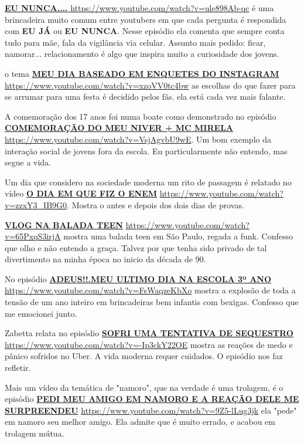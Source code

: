 \href{https://www.youtube.com/watch?v=ule898Ab-qc}{\textbf{EU NUNCA.... }} \url{https://www.youtube.com/watch?v=ule898Ab-qc} é uma brincadeira muito comum entre youtubers em que cada pergunta é respondida com \textbf{EU JÁ} ou \textbf{EU NUNCA}. Nesse episódio ela comenta que sempre conta tudo para mãe, fala da vigilância via celular. Assunto mais pedido: ficar, namorar... relacionamento é algo que inspira muito a curiosidade dos jovens.

o tema \href{https://www.youtube.com/watch?v=xzoVV0tc4bw}{\textbf{MEU DIA BASEADO EM ENQUETES DO INSTAGRAM }} \url{https://www.youtube.com/watch?v=xzoVV0tc4bw} as escolhas do que fazer para se arrumar para uma festa é decidido pelos fãs. ela está cada vez mais falante.

A comemoração dos 17 anos foi numa boate como demonstrado no episódio \href{https://www.youtube.com/watch?v=VsjAgvbU9wE}{\textbf{COMEMORAÇÃO DO MEU NIVER + MC MIRELA}} \url{https://www.youtube.com/watch?v=VsjAgvbU9wE}. Um bom exemplo da interação social de jovens fora da escola. Eu particularmente não entendo, mas segue a vida.

Um dia que considero na sociedade moderna um rito de passagem é relatado no vídeo \href{https://www.youtube.com/watch?v=zzxY3_IB9G0}{\textbf{O DIA EM QUE FIZ O ENEM}} \url{https://www.youtube.com/watch?v=zzxY3_IB9G0}. Mostra o antes e depois dos dois dias de provas.

\href{https://www.youtube.com/watch?v=65PxqS3irjA}{\textbf{VLOG NA BALADA TEEN}} \url{https://www.youtube.com/watch?v=65PxqS3irjA} mostra uma balada teen em São Paulo, regada a funk. Confesso que olho e não entendo a graça. Talvez por que tenha sido privado de tal divertimento na minha época no inicio da década de 90.

No episódio \href{https://www.youtube.com/watch?v=FsWaqzeKbXo}{\textbf{ADEUS!!.MEU ULTIMO DIA NA ESCOLA 3º ANO }} \url{https://www.youtube.com/watch?v=FsWaqzeKbXo} mostra a explosão de toda a tensão de um ano inteiro em brincadeiras bem infantis com bexigas. Confesso que me emocionei junto.

Zabetta relata no episódio \href{https://www.youtube.com/watch?v=-Ip3ckY22OE}{\textbf{SOFRI UMA TENTATIVA DE SEQUESTRO}} \url{https://www.youtube.com/watch?v=-Ip3ckY22OE} mostra as reações de medo e pânico sofridos no Uber. A vida moderna requer cuidados. O episódio nos faz refletir.

Mais um vídeo da temática de "namoro", que na verdade é uma trolagem, é o episódio \href{https://www.youtube.com/watch?v=9Z5-lLug3jk}{\textbf{PEDI MEU AMIGO EM NAMORO E A REAÇÃO DELE ME SURPREENDEU}} \url{https://www.youtube.com/watch?v=9Z5-lLug3jk} ela "pede" em namoro seu melhor amigo. Ela admite que é muito errado, e acabou em trolagem mútua.

